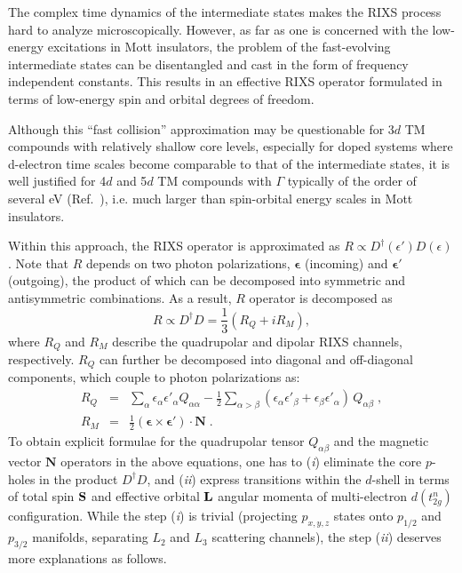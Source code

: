 \documentclass[twocolumn,prb,aps,showpacs,superscriptaddress]{revtex4-1}
\begin{document}
The complex time dynamics of the intermediate states makes the RIXS process 
hard to analyze microscopically. However, as far as one is concerned with 
the low-energy excitations in Mott insulators, the problem of the 
fast-evolving intermediate states can be disentangled and cast in the form of 
frequency independent constants\cite{AmentPRB09,HaverkortPRL10,Sav15}. This 
results in an effective RIXS operator formulated in terms of low-energy spin 
and orbital degrees of freedom. 

Although this ``fast collision'' approximation may be questionable for 3$d$ TM
compounds with relatively shallow core levels, especially for doped systems 
where d-electron time scales become comparable to that of the intermediate 
states\cite{DemlerPRL14}, it is well justified for 4$d$ and 5$d$ TM compounds 
with $\Gamma$ typically of the order of several eV (Ref.~), 
i.e. much larger than spin-orbital energy scales in Mott insulators. 

Within this  approach, the RIXS operator is approximated as 
$R\propto D^\dagger(\epsilon')D(\epsilon)$. Note that $R$ depends on two
photon polarizations, $\bm{\epsilon}$ (incoming) and $\bm{\epsilon'}$ 
(outgoing), the product of which can be decomposed into symmetric and 
antisymmetric combinations. As a result, $R$ operator is decomposed as
\begin{equation}
R\propto D^\dagger D=\frac{1}{3}(R_Q+iR_M),
\end{equation}
where $R_Q$ and $R_M$ describe the quadrupolar and dipolar RIXS channels, 
respectively. $R_Q$ can further be decomposed into diagonal and off-diagonal 
components, which couple to photon polarizations as: 
\begin{eqnarray}
R_Q&=& \sum_{\alpha}\epsilon_\alpha\epsilon'_\alpha Q_{\alpha\alpha}-
\tfrac{1}{2}\sum_{\alpha>\beta}(\epsilon_\alpha\epsilon'_\beta+
\epsilon_\beta\epsilon'_\alpha)\,Q_{\alpha\beta}\;, \\
R_M&=&\tfrac{1}{2}(\bm{\epsilon}\times\bm{\epsilon'})\cdot{\mathbf N}\;. 
\end{eqnarray}
To obtain explicit formulae for the quadrupolar tensor $Q_{\alpha\beta}$
and the magnetic vector ${\mathbf N}$ operators in the above equations, one 
has to ({\it i}) eliminate the core $p$-holes in the product $D^\dagger D$, and 
({\it ii}) express transitions within the $d$-shell in terms of total spin 
${\bf S}$ and effective orbital ${\bf L}$ angular momenta of multi-electron 
$d(t_{2g}^n)$ configuration. While the step ({\it i}) is trivial (projecting 
$p_{x,y,z}$ states onto $p_{1/2}$ and $p_{3/2}$ manifolds, separating $L_2$
and $L_3$ scattering channels), the step ({\it ii}) deserves more explanations 
as follows. 
\end{document}
